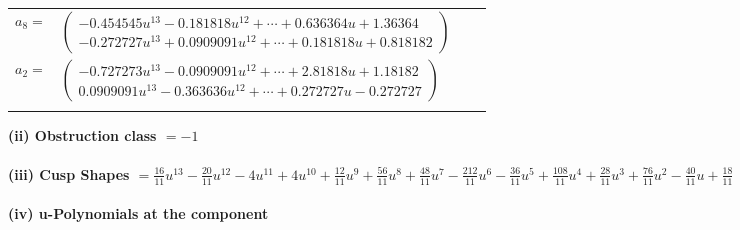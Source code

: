 \documentclass[1p]{elsarticle_modified}
\theoremstyle{definition}
\begin{document}
\begin{tabular}{m{7pt} m{180pt} m{7pt} m{180pt} }
\flushright $a_{8}=$&$\begin{pmatrix}-0.454545 u^{13}-0.181818 u^{12}+\cdots+0.636364 u+1.36364\\-0.272727 u^{13}+0.0909091 u^{12}+\cdots+0.181818 u+0.818182\end{pmatrix}$ \\
\flushright $a_{2}=$&$\begin{pmatrix}-0.727273 u^{13}-0.0909091 u^{12}+\cdots+2.81818 u+1.18182\\0.0909091 u^{13}-0.363636 u^{12}+\cdots+0.272727 u-0.272727\end{pmatrix}$\\&\end{tabular}
\flushleft \textbf{(ii) Obstruction class $= -1$}\\~\\
\flushleft \textbf{(iii) Cusp Shapes $= \frac{16}{11} u^{13}-\frac{20}{11} u^{12}-4 u^{11}+4 u^{10}+\frac{12}{11} u^9+\frac{56}{11} u^8+\frac{48}{11} u^7-\frac{212}{11} u^6-\frac{36}{11} u^5+\frac{108}{11} u^4+\frac{28}{11} u^3+\frac{76}{11} u^2-\frac{40}{11} u+\frac{18}{11}$}\\~\\
\newpage\renewcommand{\arraystretch}{1}
\flushleft \textbf{(iv) u-Polynomials at the component}\newline \\
\end{document}
